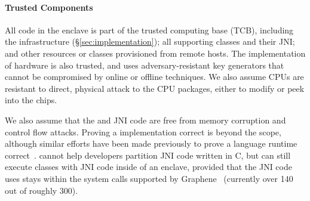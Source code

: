 

\paragraph{Trusted Components}
All code in the enclave is part of the trusted computing base (TCB),
including the \sysname{} infrastructure 
(\S\ref{sec:implementation}); %
all supporting classes and their JNI;
and other resources or classes provisioned from remote hosts.
The implementation of \sgx{} hardware is also trusted,
and uses adversary-resistant key generators that cannot be compromised
by online or offline techniques.
We also assume \intel{} CPUs are resistant to direct, physical attack to the CPU packages, either to modify or peek into the chips.

We also assume that the \jvm{} and JNI code are free from memory corruption and control flow attacks.
Proving a \jvm{} implementation correct is beyond the scope, although similar 
efforts have been made previously to prove a language runtime correct~\cite{yang10safe}.
\sysname{} cannot help developers partition JNI code written in C,
but can still execute classes with JNI code inside of an enclave, provided that
the JNI code uses stays within the system calls supported by Graphene~\cite{tsai14graphene} (currently over 140 out of roughly 300).


\begin{comment}
We do not support running \java{} application with JIT optimization
inside the enclave.
Even if running \java{} application with JIT optimization
can improve the performance of execution,
we avoid adding the huge JIT compiler to the TCB of the enclaves.
\end{comment}

